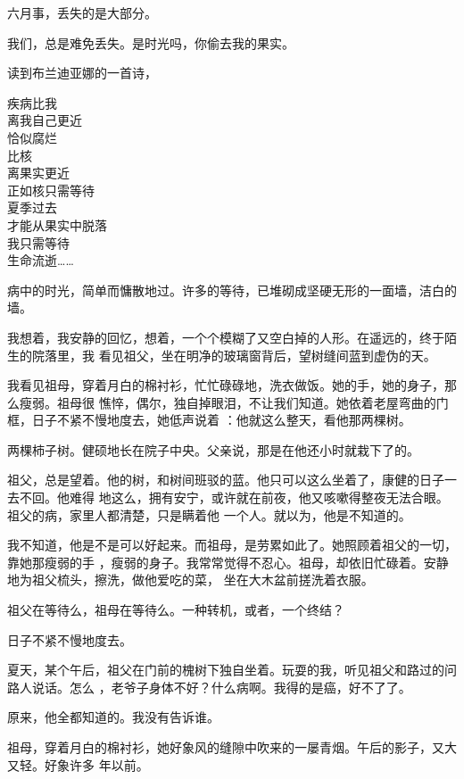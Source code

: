 \documentclass[12pt,a4paper]{article}
\begin{document}
		六月事，丢失的是大部分。\par
		我们，总是难免丢失。是时光吗，你偷去我的果实。

	\endwriting



		读到布兰迪亚娜的一首诗，

		\longpoem{}{}{}
		疾病比我 \\
		离我自己更近 \\
		恰似腐烂 \\
		比核 \\
		离果实更近 \\
		正如核只需等待 \\
		夏季过去 \\
		才能从果实中脱落 \\
		我只需等待 \\
		生命流逝……
		\endlongpoem

		病中的时光，简单而慵散地过。许多的等待，已堆砌成坚硬无形的一面墙，洁白的墙。

		我想着，我安静的回忆，想着，一个个模糊了又空白掉的人形。在遥远的，终于陌生的院落里，我
	看见祖父，坐在明净的玻璃窗背后，望树缝间蓝到虚伪的天。

		我看见祖母，穿着月白的棉衬衫，忙忙碌碌地，洗衣做饭。她的手，她的身子，那么瘦弱。祖母很
	憔悴，偶尔，独自掉眼泪，不让我们知道。她依着老屋弯曲的门框，日子不紧不慢地度去，她低声说着
	：他就这么整天，看他那两棵树。

		两棵柿子树。健硕地长在院子中央。父亲说，那是在他还小时就栽下了的。

		祖父，总是望着。他的树，和树间班驳的蓝。他只可以这么坐着了，康健的日子一去不回。他难得
	地这么，拥有安宁，或许就在前夜，他又咳嗽得整夜无法合眼。祖父的病，家里人都清楚，只是瞒着他
	一个人。就以为，他是不知道的。

		我不知道，他是不是可以好起来。而祖母，是劳累如此了。她照顾着祖父的一切，靠她那瘦弱的手
	，瘦弱的身子。我常常觉得不忍心。祖母，却依旧忙碌着。安静地为祖父梳头，擦洗，做他爱吃的菜，
	坐在大木盆前搓洗着衣服。

		祖父在等待么，祖母在等待么。一种转机，或者，一个终结？

		日子不紧不慢地度去。

		夏天，某个午后，祖父在门前的槐树下独自坐着。玩耍的我，听见祖父和路过的问路人说话。怎么
	，老爷子身体不好？什么病啊。我得的是癌，好不了了。

		原来，他全都知道的。我没有告诉谁。

		祖母，穿着月白的棉衬衫，她好象风的缝隙中吹来的一屡青烟。午后的影子，又大又轻。好象许多
	年以前。
\end{document}
